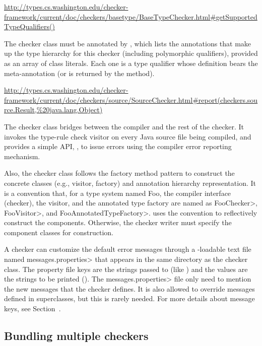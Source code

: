 \urldef{\getSupportedTypeQualifiersURL}\url{http://types.cs.washington.edu/checker-framework/current/doc/checkers/basetype/BaseTypeChecker.html#getSupportedTypeQualifiers()}

The checker class must be annotated by
, which lists the annotations
that make up the type hierarchy for this checker (including
polymorphic qualifiers), provided as an array of class literals.  Each
one is a type qualifier whose definition bears the
 meta-annotation (or is
returned by the
method).

\urldef{\reportURL}\url{http://types.cs.washington.edu/checker-framework/current/doc/checkers/source/SourceChecker.html#report(checkers.source.Result,%20java.lang.Object)}

The checker class bridges between the compiler and the rest of the checker.  It
invokes the type-rule check visitor on every Java source file being
compiled, and provides a simple API, , to issue
errors using the compiler error reporting mechanism.

Also, the checker class follows the factory method pattern to
construct the concrete classes (e.g., visitor, factory) and annotation
hierarchy representation.  It is a convention that, for
a type system named Foo, the compiler
interface (checker), the visitor, and the annotated type factory are
named as \<FooChecker>, \<FooVisitor>, and \<FooAnnotatedTypeFactory>.
 uses the convention to
reflectively construct the components.  Otherwise, the checker writer
must specify the component classes for construction.

A checker can customize the default error messages through a
-loadable text file named
\<messages.properties> that appears in the same directory as the checker class.
The property file keys are the strings passed to 
(like ) and the values are the strings to be
printed ().
The \<messages.properties> file only need to mention the new messages that
the checker defines.
It is also allowed to override messages defined in superclasses, but this
is rarely needed.
For more details about message keys, see Section~.


\subsection{Bundling multiple checkers}

